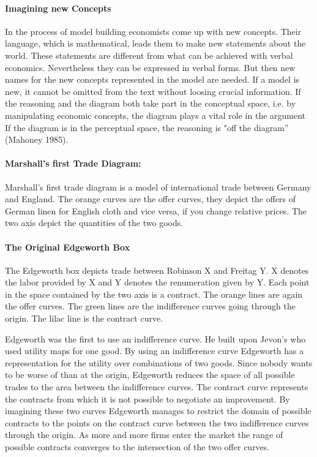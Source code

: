 \documentclass[12pt,a4paper]{article}
\begin{document}
\paragraph{Imagining new Concepts}
In the process of model building economists come up with new concepts. Their language, which is mathematical, leads them to make new statements about the world. These statements are different from what can be achieved with verbal economics. Nevertheless they can be expressed in verbal forms. But then new names for the new concepts represented in the model are needed. If a model is new, it cannot be omitted from the text without loosing crucial information. 
If the reasoning and the diagram both take part in the conceptual space, i.e. by manipulating economic concepts, the diagram plays a vital role in the argument If the diagram is in the perceptual space, the reasoning is "off the diagram” (Mahoney 1985).

\paragraph{Marshall's first Trade Diagram:}
Marshall's first trade diagram is a model of international trade between Germany and England. 
The orange curves are the offer curves, they depict the offers of German linen for English cloth and vice versa, if you change relative prices. The two axis depict the quantities of the two goods.

\paragraph{The Original Edgeworth Box}
The Edgeworth box depicts trade between Robinson X and Freitag Y. X denotes the labor provided by X and Y denotes the renumeration given by Y. Each point in the space contained by the two axis is a contract. The orange lines are again the offer curves. The green lines are the indifference curves going through the origin. The lilac line is the contract curve.

Edgeworth was the first to use an indifference curve. He built upon Jevon's who used utility maps for one good. By using an indifference curve Edgeworth has a representation for the utility over combinations of two goods. Since nobody wants to be worse of than at the origin, Edgeworth reduces the space of all possible trades to the area between the indifference curves. The contract curve represents the contracts from which it is not possible to negotiate an improvement.
By imagining these two curves Edgeworth manages to restrict the domain of possible contracts to the points on the contract curve between the two indifference curves through the origin.
As more and more firms enter the market the range of possible contracts converges to the intersection of the two offer curves.
\end{document}
